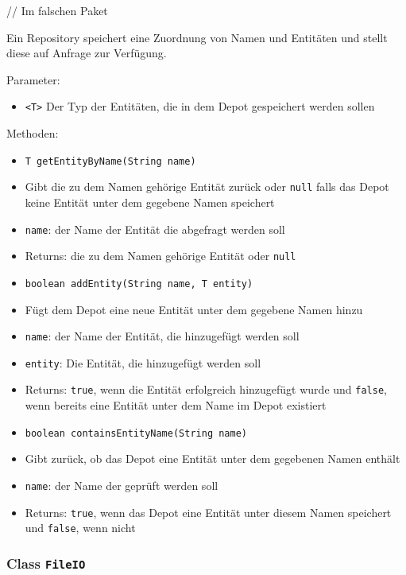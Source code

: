 \documentclass[parskip=full,11pt]{scrartcl}
\begin{document}
// Im falschen Paket

Ein Repository speichert eine Zuordnung von Namen und Entitäten und stellt diese auf Anfrage zur Verfügung.

Parameter:
\begin{itemize}\itemsep -10pt
	\item \texttt{<T>} Der Typ der Entitäten, die in dem Depot gespeichert werden sollen
\end{itemize}


Methoden:
\begin{itemize}\itemsep -10pt
	\item \texttt{T getEntityByName(String name)}
	\item[] Gibt die zu dem Namen gehörige Entität zurück oder \texttt{null} falls das Depot keine Entität unter dem gegebene Namen speichert
	\item[] \texttt{name}: der Name der Entität die abgefragt werden soll
	\item[] Returns: die zu dem Namen gehörige Entität oder \texttt{null}
	
	\item \texttt{boolean addEntity(String name, T entity)}
	\item[] Fügt dem Depot eine neue Entität unter dem gegebene Namen hinzu
	\item[] \texttt{name}: der Name der Entität, die hinzugefügt werden soll
	\item[] \texttt{entity}: Die Entität, die hinzugefügt werden soll
	\item[] Returns: \texttt{true}, wenn die Entität erfolgreich hinzugefügt wurde und \texttt{false}, wenn bereits eine Entität unter dem Name im Depot existiert 
	
	\item \texttt{boolean containsEntityName(String name)}
	\item[] Gibt zurück, ob das Depot eine Entität unter dem gegebenen Namen enthält
	\item[] \texttt{name}: der Name der geprüft werden soll
	\item[] Returns: \texttt{true}, wenn das Depot eine Entität unter diesem Namen speichert und \texttt{false}, wenn nicht
	
\end{itemize}

\subsubsection{Class \texttt{FileIO}}
\end{document}
